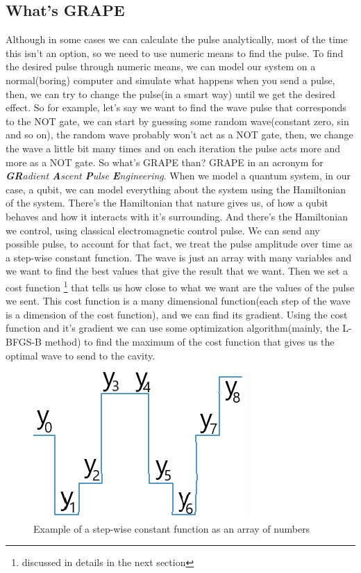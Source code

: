 \documentclass[english, a4paper, 12pt, twoside]{article}
\numberwithin{equation}{section} %
\begin{document}
\subsection{What's GRAPE}
Although in some cases we can calculate the pulse analytically, most of the time this isn't an option, so we need to use numeric means to find the pulse. To find the desired pulse through numeric means, we can model our system on a normal(boring) computer and simulate what happens when you send a pulse, then, we can try to change the pulse(in a smart way) until we get the desired effect. So for example, let's say we want to find the wave pulse that corresponds to the NOT gate, we can start by guessing some random wave(constant zero, sin and so on), the random wave probably won't act as a NOT gate, then, we change the wave a little bit many times and on each iteration the pulse acts more and more as a NOT gate.
So what's GRAPE than? GRAPE in an acronym for \textit{\textbf{GR}adient \textbf{A}scent \textbf{P}ulse \textbf{E}ngineering}. When we model a quantum system, in our case, a qubit, we can model everything about the system using the Hamiltonian of the system. There's the Hamiltonian that nature gives us, of how a qubit behaves and how it interacts with it's surrounding. And there's the Hamiltonian we control, using classical electromagnetic control pulse. We can send any possible pulse, to account for that fact, we treat the pulse amplitude over time as a step-wise constant function. The wave is just an array with many variables and we want to find the best values that give the result that we want. Then we set a cost function \footnote{discussed in details in the next section} that tells us how close to what we want are the values of the pulse we sent. This cost function is a many dimensional function(each step of the wave is a dimension of the cost function), and we can find its gradient. Using the cost function and it's gradient we can use some optimization algorithm(mainly, the L-BFGS-B method) to find the maximum of the cost function that gives us the optimal wave to send to the cavity.

\begin{figure}[H]
    \centering
    \includegraphics[width=0.3\columnwidth]{step-wise_example.png} %
    \caption{Example of a step-wise constant function as an array of numbers}
    \label{fig:step-wise-const}
\end{figure}
\end{document}

